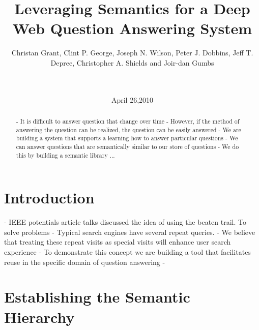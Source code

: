 \documentclass{www2010-submission}
\begin{document}
\title{Leveraging Semantics for a Deep Web Question Answering System} 
\author{
	 \alignauthor Christan Grant, Clint P. George, Joseph N. Wilson, Peter J. Dobbins, Jeff T. Depree, Christopher A. Shields and Joir-dan Gumbs\\
	  \\  \\
}
\date{April 26,2010}

\maketitle

\begin{abstract}
- It is difficult to answer question that change over time
- However, if the method of answering the question can be realized, the question can be easily answered
- We are building a system that supports a learning how to answer particular questions
- We can answer questions that are semantically similar to our store of questions
- We do this by building a semantic library ...
\end{abstract}




\section{Introduction}
- IEEE potentials article talks discussed the idea of using the beaten trail. \cite{5379671} To solve problems
- Typical search engines have several repeat queries.
- We believe that treating these repeat visits as special visits will enhance user search experience
- To demonstrate this concept we are building a tool that facilitates reuse in the specific domain of question answering
-

\section{Establishing the Semantic Hierarchy}
\end{document}
